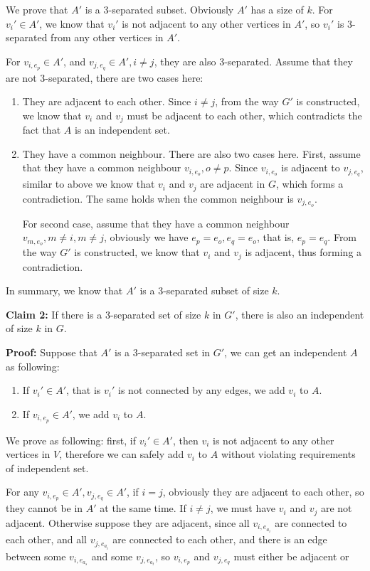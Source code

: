 \documentclass{article}
\begin{document}
We prove that $A'$ is a $3$-separated subset. Obviously $A'$ has a size of $k$. For $v_i' \in A'$,
we know that $v_i'$ is not adjacent to any other vertices in $A'$, so $v_i'$ is $3$-separated from
any other vertices in $A'$.

For $v_{i, e_p} \in A'$, and $v_{j, e_q} \in A', i \neq j$, they are also $3$-separated. 
Assume that they are not $3$-separated,  there are two cases here:
\begin{enumerate}
  \item They are adjacent to each other. Since $i \neq j$, from the way $G'$ is constructed, we know that $v_i$ and
    $v_j$ must be adjacent to each other, which contradicts the fact that $A$ is an independent set.
  \item They have a common neighbour. There are also two cases here. First, assume that they have a common
    neighbour $v_{i, e_o}, o \neq p$. Since $v_{i, e_o}$ is adjacent to $v_{j, e_q}$, similar to
    above we know that $v_i$ and $v_j$ are adjacent in $G$, which forms a contradiction. The same
    holds when the common neighbour is $v_{j, e_o}$.

    For second case, assume that they have a common neighbour $v_{m, e_o}, m\neq i,m \neq j $, 
    obviously we have $e_p = e_o, e_q = e_o$, that is, $e_p = e_q$. From the way $G'$ is
    constructed, we know that $v_i$ and $v_j$ is adjacent, thus forming a contradiction.     
\end{enumerate}
In summary, we know that $A'$ is a $3$-separated subset of size $k$.

\textbf{Claim 2:} If there is a $3$-separated set of size $k$ in $G'$, there is also an independent
of size $k$ in $G$.

\textbf{Proof:} Suppose that $A'$ is a $3$-separated set in $G'$, we can get an independent $A$ as
following:
\begin{enumerate}
  \item If $v_i'\in A'$, that is $v_i'$ is not connected by any edges, we add $v_i$ to $A$.
  \item If $v_{i, e_p}\in A'$, we add  $v_i$ to $A$.
\end{enumerate}
We prove as following: first, if $v_i' \in A'$, then $v_i$ is not adjacent to any other vertices in
$V$, therefore we can safely add $v_i$ to $A$ without violating requirements of independent set.

For any $v_{i, e_p} \in A', v_{j, e_q} \in A'$, if $i = j$, obviously they are adjacent to each
other, so they cannot be in $A'$ at the same time. If $i \neq j$, we must have $v_i$ and $v_j$ are
not adjacent. Otherwise suppose they are adjacent, since all $v_{i, e_{a_i}}$ are connected to each
other, and all $v_{j, e_{a_i}}$ are connected to each other, and there is an edge between some
$v_{i, e_{a_s}}$ and some $v_{j, e_{a_t}}$, so $v_{i, e_p}$ and $v_{j, e_q}$ must either be adjacent
or 
\end{document}
